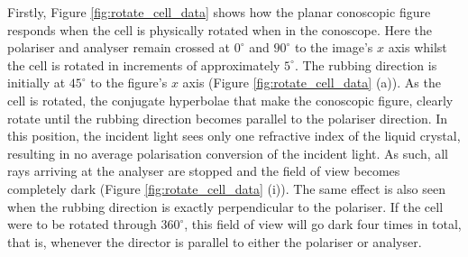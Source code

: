 Firstly, Figure \ref{fig:rotate_cell_data} shows how the planar conoscopic figure responds when the cell is physically rotated when in the conoscope. Here the polariser and analyser remain crossed at $0^\circ$ and $90^\circ$ to the image's $x$ axis whilst the cell is rotated in increments of approximately $5^\circ$. The rubbing direction is initially at $45^\circ$ to the figure's $x$ axis (Figure \ref{fig:rotate_cell_data} (a)). As the cell is rotated, the conjugate hyperbolae that make the conoscopic figure, clearly rotate until the rubbing direction becomes parallel to the polariser direction. In this position, the incident light sees only one refractive index of the liquid crystal, resulting in no average polarisation conversion of the incident light. As such, all rays arriving at the analyser are stopped and the field of view becomes completely dark (Figure \ref{fig:rotate_cell_data} (i)). The same effect is also seen when the rubbing direction is exactly perpendicular to the polariser. If the cell were to be rotated through $360^\circ$, this field of view will go dark four times in total, that is, whenever the director is parallel to either the polariser or analyser.

